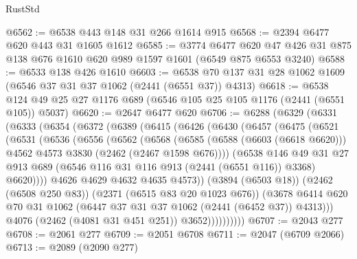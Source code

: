 \begin{lexlean}{RustStd}
\begin{coremodule}
@6562 := @6538 @443 @148 @31 @266 @1614 @915
@6568 := @2394 @6477 @620 @443 @31 @1605 @1612
@6585 := @3774
    @6477
    @620
    @47
    @426
    @31
    @875
    @138
    @676
    @1610
    @620
    @989
    @1597
    @1601
    (@6549 @875 @6553 @3240)
@6588 := @6533 @138 @426 @1610
@6603 := @6538 @70 @137 @31 @28 @1062 @1609 (@6546 @37 @31 @37 @1062 (@2441 (@6551 @37)) @4313)
@6618 := @6538 @124 @49 @25 @27 @1176 @689 (@6546 @105 @25 @105 @1176 (@2441 (@6551 @105)) @5037)
@6620 := @2647 @6477 @620
@6706 := @6288
    (@6329
      (@6331
        (@6333
          (@6354
            (@6372
              (@6389
                (@6415
                  (@6426
                    (@6430
                      (@6457
                        (@6475
                          (@6521
                            (@6531
                              (@6536
                                (@6556
                                  (@6562
                                    (@6568
                                      (@6585
                                        (@6588 (@6603 (@6618 @6620)))
                                        @4562
                                        @4573
                                        @3830
                                        (@2462 (@2467 @1598 @676))))
                                    (@6538
                                      @146
                                      @49
                                      @31
                                      @27
                                      @913
                                      @689
                                      (@6546 @116 @31 @116 @913 (@2441 (@6551 @116)) @3368)
                                      @6620))))
                              @4626
                              @4629
                              @4632
                              @4635
                              @4573))
                          (@3894 (@6503 @18))
                          (@2462 (@6508 @250 @83))
                          (@2371 (@6515 @83 @20 @1023 @676))
                          (@3678
                            @6414
                            @620
                            @70
                            @31
                            @1062
                            (@6447 @37 @31 @37 @1062 (@2441 (@6452 @37)) @4313)))
                        @4076
                        (@2462 (@4081 @31 @451 @251))
                        @3652))))))))))
@6707 := @2043 @277
@6708 := @2061 @277
@6709 := @2051 @6708
@6711 := @2047 (@6709 @2066)
@6713 := @2089 (@2090 @277)

\end{coremodule}
\end{lexlean}
